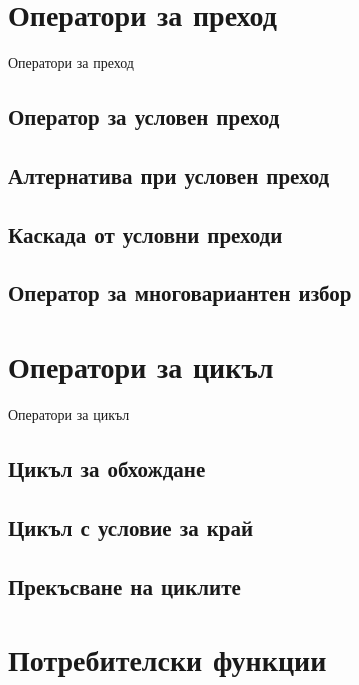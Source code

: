 \documentclass{beamer}
\begin{document}
\section{Оператори за преход}

\begin{frame}
\center \huge{Оператори за преход}
\end{frame}

\subsection{Оператор за условен преход}

\subsection{Алтернатива при условен преход}

\subsection{Каскада от условни преходи}

\subsection{Оператор за многовариантен избор}

\section{Оператори за цикъл}

\begin{frame}
\center \huge{Оператори за цикъл}
\end{frame}

\subsection{Цикъл за обхождане}

\subsection{Цикъл с условие за край}

\subsection{Прекъсване на циклите}

\section{Потребителски функции}
\end{document}
